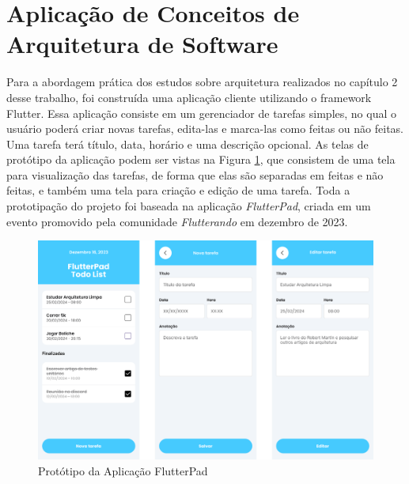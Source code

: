 \documentclass[12pt, %
openright, 
oneside, %
a4paper,    %
brazil]{facom-ufu-abntex2}
\begin{document}
\section{Aplicação de Conceitos de Arquitetura de Software} \label{sec:arch}

Para a abordagem prática dos estudos sobre arquitetura realizados no capítulo 2 desse trabalho, foi construída uma aplicação cliente utilizando o framework Flutter. Essa aplicação consiste em um gerenciador de tarefas simples, no qual o usuário poderá criar novas tarefas, edita-las e marca-las como feitas ou não feitas. Uma tarefa terá título, data, horário e uma descrição opcional. As telas de protótipo da aplicação podem ser vistas na Figura \ref{fig:flutterpad_figma}, que consistem de uma tela para visualização das tarefas, de forma que elas são separadas em feitas e não feitas, e também uma tela para criação e edição de uma tarefa. Toda a prototipação do projeto foi baseada na aplicação \textit{FlutterPad}, criada em um evento promovido pela comunidade \textit{Flutterando} em dezembro de 2023.

\begin{figure}[ht]
    \centering
    \includegraphics[width=.85\textwidth]{figures/arch/flutterpad_figma.png}
    \caption{Protótipo da Aplicação FlutterPad}
    \label{fig:flutterpad_figma}
\end{figure}
\end{document}
